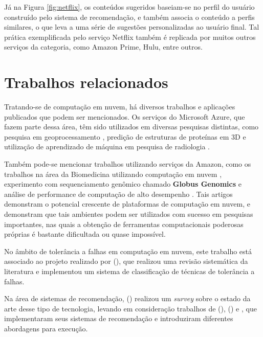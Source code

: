 \documentclass[
	12pt,				%
	oneside,			%
	a4paper,			%
	chapter=TITLE,		%
	english,			%
	french,				%
	spanish,			%
	brazil				%
	]{abntex2}
\begin{document}
Já na Figura \ref{fig:netflix}, os conteúdos sugeridos baseiam-se no perfil do usuário construído pelo sistema de recomendação, e também associa o conteúdo a perfis similares, o que leva a uma série de sugestões personalizadas ao usuário final. Tal prática exemplificada pelo serviço Netflix também é replicada por muitos outros serviços da categoria, como Amazon Prime, Hulu, entre outros.

\section{Trabalhos relacionados}

Tratando-se de computação em nuvem, há diversos trabalhos e aplicações publicados que podem ser mencionados. Os serviços do Microsoft Azure, que fazem parte dessa área, têm sido utilizados em diversas pesquisas distintas, como pesquisa em geoprocessamento \cite{gong2010geoprocessing}, predição de estruturas de proteínas em 3D \cite{mrozek2015scaling} e utilização de aprendizado de máquina em pesquisa de radiologia \cite{kohli2017implementing}.

Também pode-se mencionar trabalhos utilizando serviços da Amazon, como os trabalhos na área da Biomedicina utilizando computação em nuvem \cite{fusaro2011biomedical}, experimento com sequenciamento genômico chamado \textbf{Globus Genomics} \cite{madduri2014experiences} e análise de performance de computação de alto desempenho \cite{jackson2010performance}. Tais artigos demonstram o potencial crescente de plataformas de computação em nuvem, e demonstram que tais ambientes podem ser utilizados com sucesso em pesquisas importantes, nas quais a obtenção de ferramentas computacionais poderosas próprias é bastante dificultada ou quase impossível.

No âmbito de tolerância a falhas em computação em nuvem, este trabalho está associado ao projeto realizado por \citeauthor{andrade2019taxonomia} (\citeyear{andrade2019taxonomia}), que realizou uma revisão sistemática da literatura e implementou um sistema de classificação de técnicas de tolerância a falhas.

Na área de sistemas de recomendação, \citeauthor{adomavicius2005toward} (\citeyear{adomavicius2005toward}) realizou um \emph{survey} sobre o estado da arte desse tipo de tecnologia, levando em consideração trabalhos de \citeauthor{resnick1994grouplens} (\citeyear{resnick1994grouplens}), \citeauthor{hill1995recommending} (\citeyear{hill1995recommending}) e \citeauthor{balabanovic1997fab}, que implementaram seus sistemas de recomendação e introduziram diferentes abordagens para execução.
\end{document}
